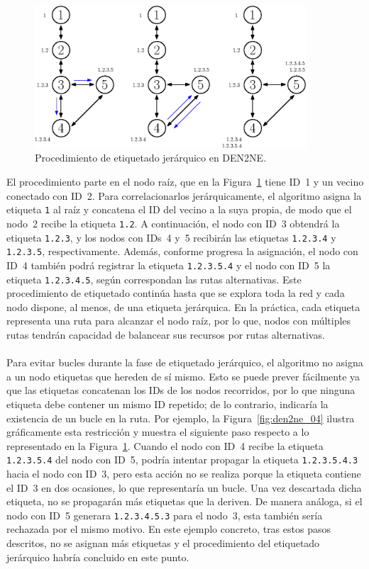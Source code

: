 \begin{figure}[ht!]
    \centering
    \includegraphics[width=0.9\textwidth]{fig/05_den2ne/den2ne_03.eps}
    \caption{Procedimiento de etiquetado jerárquico en DEN2NE.}
    \label{fig:den2ne_03}
\end{figure}

El procedimiento parte en el nodo raíz, que en la Figura~\ref{fig:den2ne_03} tiene ID~1 y un vecino conectado con ID~2. Para correlacionarlos jerárquicamente, el algoritmo asigna la etiqueta \texttt{1} al raíz y concatena el ID del vecino a la suya propia, de modo que el nodo~2 recibe la etiqueta \texttt{1.2}. A continuación, el nodo con ID~3 obtendrá la etiqueta \texttt{1.2.3}, y los nodos con IDs~4 y~5 recibirán las etiquetas \texttt{1.2.3.4} y \texttt{1.2.3.5}, respectivamente. Además, conforme progresa la asignación, el nodo con ID~4 también podrá registrar la etiqueta \texttt{1.2.3.5.4} y el nodo con ID~5 la etiqueta \texttt{1.2.3.4.5}, según correspondan las rutas alternativas. Este procedimiento de etiquetado continúa hasta que se explora toda la red y cada nodo dispone, al menos, de una etiqueta jerárquica. En la práctica, cada etiqueta representa una ruta para alcanzar el nodo raíz, por lo que, nodos con múltiples rutas tendrán capacidad de balancear sus recursos por rutas alternativas.\\
\\
Para evitar bucles durante la fase de etiquetado jerárquico, el algoritmo no asigna a un nodo etiquetas que hereden de sí mismo. Esto se puede prever fácilmente ya que las etiquetas concatenan los IDs de los nodos recorridos, por lo que ninguna etiqueta debe contener un mismo ID repetido; de lo contrario, indicaría la existencia de un bucle en la ruta. Por ejemplo, la Figura~\ref{fig:den2ne_04} ilustra gráficamente esta restricción y muestra el siguiente paso respecto a lo representado en la Figura~\ref{fig:den2ne_03}. Cuando el nodo con ID~4 recibe la etiqueta \texttt{1.2.3.5.4} del nodo con ID~5, podría intentar propagar la etiqueta \texttt{1.2.3.5.4.3} hacia el nodo con ID~3, pero esta acción no se realiza porque la etiqueta contiene el ID~3 en dos ocasiones, lo que representaría un bucle. Una vez descartada dicha etiqueta, no se propagarán más etiquetas que la deriven. De manera análoga, si el nodo con ID~5 generara \texttt{1.2.3.4.5.3} para el nodo~3, esta también sería rechazada por el mismo motivo. En este ejemplo concreto, tras estos pasos descritos, no se asignan más etiquetas y el procedimiento del etiquetado jerárquico habría concluido en este punto.



